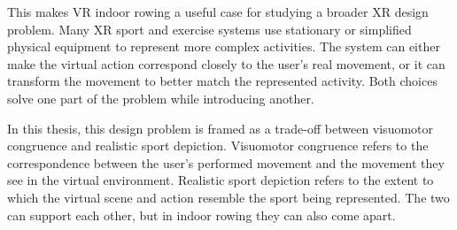 This makes VR indoor rowing a useful case for studying a broader XR design problem. Many XR sport and exercise systems use stationary or simplified physical equipment to represent more complex activities. The system can either make the virtual action correspond closely to the user's real movement, or it can transform the movement to better match the represented activity. Both choices solve one part of the problem while introducing another.

In this thesis, this design problem is framed as a trade-off between visuomotor congruence and realistic sport depiction. Visuomotor congruence refers to the correspondence between the user's performed movement and the movement they see in the virtual environment. Realistic sport depiction refers to the extent to which the virtual scene and action resemble the sport being represented. The two can support each other, but in indoor rowing they can also come apart.
